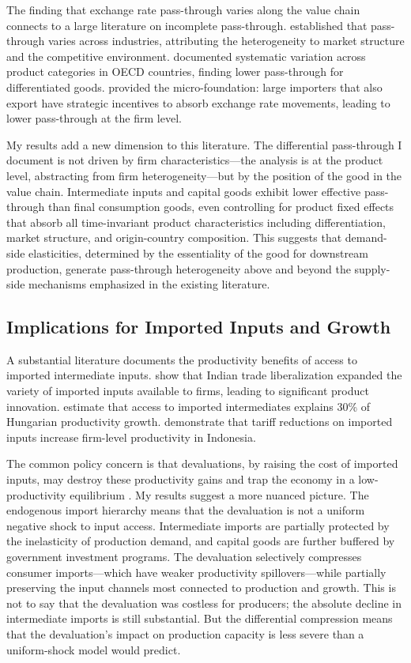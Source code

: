 \documentclass[12pt]{article}
\begin{document}
The finding that exchange rate pass-through varies along the value chain connects to a large literature on incomplete pass-through. \citet{goldberg1997goods} established that pass-through varies across industries, attributing the heterogeneity to market structure and the competitive environment. \citet{campa2005exchange} documented systematic variation across product categories in OECD countries, finding lower pass-through for differentiated goods. \citet{amiti2014importers} provided the micro-foundation: large importers that also export have strategic incentives to absorb exchange rate movements, leading to lower pass-through at the firm level.

My results add a new dimension to this literature. The differential pass-through I document is not driven by firm characteristics---the analysis is at the product level, abstracting from firm heterogeneity---but by the position of the good in the value chain. Intermediate inputs and capital goods exhibit lower effective pass-through than final consumption goods, even controlling for product fixed effects that absorb all time-invariant product characteristics including differentiation, market structure, and origin-country composition. This suggests that demand-side elasticities, determined by the essentiality of the good for downstream production, generate pass-through heterogeneity above and beyond the supply-side mechanisms emphasized in the existing literature.

\subsection{Implications for Imported Inputs and Growth}

A substantial literature documents the productivity benefits of access to imported intermediate inputs. \citet{goldberg2010imported} show that Indian trade liberalization expanded the variety of imported inputs available to firms, leading to significant product innovation. \citet{halpern2015imported} estimate that access to imported intermediates explains 30\% of Hungarian productivity growth. \citet{amiti2007trade} demonstrate that tariff reductions on imported inputs increase firm-level productivity in Indonesia.

The common policy concern is that devaluations, by raising the cost of imported inputs, may destroy these productivity gains and trap the economy in a low-productivity equilibrium \citep{rodrik2008real}. My results suggest a more nuanced picture. The endogenous import hierarchy means that the devaluation is not a uniform negative shock to input access. Intermediate imports are partially protected by the inelasticity of production demand, and capital goods are further buffered by government investment programs. The devaluation selectively compresses consumer imports---which have weaker productivity spillovers---while partially preserving the input channels most connected to production and growth. This is not to say that the devaluation was costless for producers; the absolute decline in intermediate imports is still substantial. But the differential compression means that the devaluation's impact on production capacity is less severe than a uniform-shock model would predict.
\end{document}
